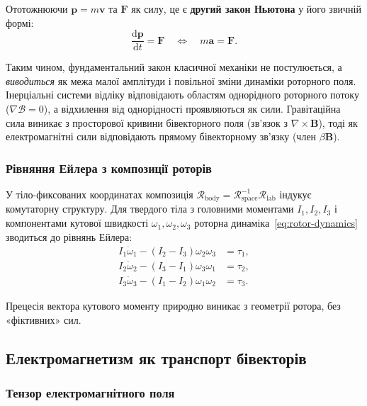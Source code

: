 \documentclass[11pt,a4paper]{article}
\newcommand{\Rotor}{\mathcal{R}}
\newcommand{\Biv}{\mathcal{B}}
\newcommand{\D}{\nabla}                        %
\theoremstyle{definition}
\theoremstyle{plain}
\theoremstyle{remark}
\begin{document}
Ототожнюючи $\mathbf{p} = m\mathbf{v}$ та $\mathbf{F}$ як силу, це є \textbf{другий закон Ньютона} у його звичній формі:
\begin{equation}
\boxed{\frac{\mathrm{d}\mathbf{p}}{\mathrm{d}t} = \mathbf{F} \quad \Longleftrightarrow \quad m\mathbf{a} = \mathbf{F}.}
\label{eq:newton-final}
\end{equation}

Таким чином, фундаментальний закон класичної механіки не постулюється, а \emph{виводиться} як межа малої амплітуди і повільної зміни динаміки роторного поля. Інерціальні системи відліку відповідають областям однорідного роторного потоку ($\D\Biv = 0$), а відхилення від однорідності проявляються як сили. Гравітаційна сила виникає з просторової кривини бівекторного поля (зв'язок з $\nabla \times \mathbf{B}$), тоді як електромагнітні сили відповідають прямому бівекторному зв'язку (член $\beta\mathbf{B}$).

\subsubsection{Рівняння Ейлера з композиції роторів}

У тіло-фиксованих координатах композиція $\Rotor_{\text{body}} = \Rotor_{\text{space}}^{-1} \Rotor_{\text{lab}}$ індукує комутаторну структуру. Для твердого тіла з головними моментами $I_1, I_2, I_3$ і компонентами кутової швидкості $\omega_1, \omega_2, \omega_3$ роторна динаміка~\eqref{eq:rotor-dynamics} зводиться до рівнянь Ейлера:
\begin{align}
I_1 \dot{\omega}_1 - (I_2 - I_3)\omega_2\omega_3 &= \tau_1, \\
I_2 \dot{\omega}_2 - (I_3 - I_1)\omega_3\omega_1 &= \tau_2, \\
I_3 \dot{\omega}_3 - (I_1 - I_2)\omega_1\omega_2 &= \tau_3.
\end{align}

Прецесія вектора кутового моменту природно виникає з геометрії ротора, без «фіктивних» сил.

\subsection{Електромагнетизм як транспорт бівекторів}

\subsubsection{Тензор електромагнітного поля}
\end{document}
